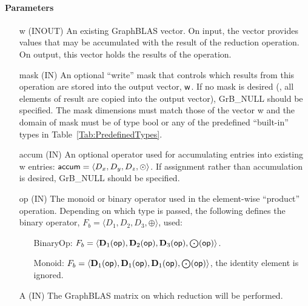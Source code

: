 \paragraph{Parameters}

\begin{itemize}[leftmargin=1.1in]
    \item[{\sf w}]    ({\sf INOUT}) An existing GraphBLAS vector.  On input,
    the vector provides values that may be accumulated with the result of the
    reduction operation.  On output, this vector holds the results of the
    operation.

    \item[{\sf mask}]  ({\sf IN}) An optional ``write'' mask that controls which
    results from this operation are stored into the output vector,
    ${\sf w}$.  If no mask is desired (\ie, all elements
    of result are copied into the output vector), {\sf GrB\_NULL}
    should be specified. The mask dimensions must match those of the
    vector {\sf w} and the domain of {\sf mask} must be
    of type {\sf bool} or any of the predefined ``built-in'' types in
    Table~\ref{Tab:PredefinedTypes}.

    \item[{\sf accum}]    ({\sf IN}) An optional operator used for accumulating
    entries into existing {\sf w} entries: ${\sf accum} = \langle D_x,
    D_y, D_z,\odot \rangle$. If assignment rather than accumulation is
    desired, {\sf GrB\_NULL} should be specified.

    \item[{\sf op}]    ({\sf IN}) The monoid or binary operator 
    used in the element-wise ``product'' operation.  Depending on which type is
    passed, the following defines the binary operator, $F_b=\langle D_1,D_2,D_3,\oplus \rangle$, used:
    \begin{itemize}[leftmargin=1.1in]
    \item[BinaryOp:] $F_b = \langle \bold{D}_1({\sf op}), \bold{D}_2({\sf op}),
    \bold{D}_3({\sf op}),\bold{\bigodot}({\sf op})\rangle$.  
    \item[Monoid:] $F_b = \langle \bold{D}_1({\sf op}), \bold{D}_1({\sf op}),
    \bold{D}_1({\sf op}),\bold{\bigodot}({\sf op})\rangle$,
    the identity element is ignored. 
    \end{itemize}
    
    \item[{\sf A}]     ({\sf IN}) The GraphBLAS matrix on which
	    reduction will be performed.
    

\end{itemize}
